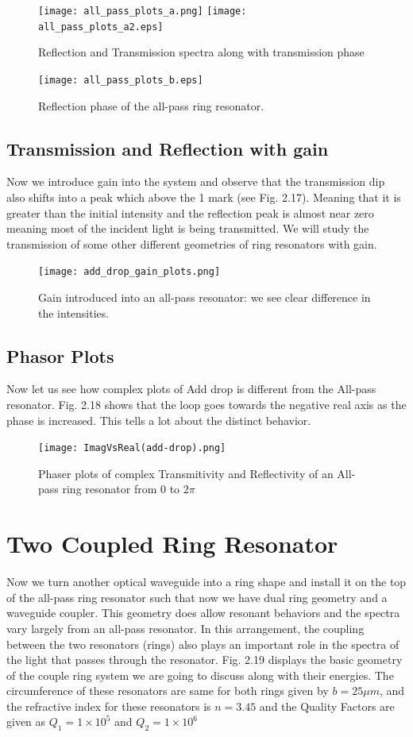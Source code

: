 \begin{figure}[h]
\centering
\texttt{[image: all\_pass\_plots\_a.png]}
\texttt{[image: all\_pass\_plots\_a2.eps]}
\caption{Reflection and Transmission spectra along with transmission phase} 
\end{figure}
\newpage
\begin{figure}[t]
\centering
\texttt{[image: all\_pass\_plots\_b.eps]}
\caption{Reflection phase of the all-pass ring resonator.}
\end{figure}

\subsection{Transmission and Reflection with gain}
Now we introduce gain into the system and observe that the transmission dip also shifts into a peak which above the 1 mark (see Fig. 2.17). Meaning that it is greater than the initial intensity and the reflection peak is almost near zero meaning most of the incident light is being transmitted. We will study the transmission of some other different geometries of ring resonators with gain. 


\begin{figure}[h]
\centering
\texttt{[image: add\_drop\_gain\_plots.png]}
\caption{Gain introduced into an all-pass resonator: we see clear difference in the intensities.}
\end{figure}

\subsection{Phasor Plots}
Now let us see how complex plots of Add drop is different from the All-pass resonator. Fig. 2.18 shows that the loop goes towards the negative real axis as the phase is increased. This tells a lot about the distinct behavior.

\begin{figure}[h]
\centering
\texttt{[image: ImagVsReal(add-drop).png]}
\caption{Phaser plots of complex Transmitivity and Reflectivity of an All-pass ring resonator from 0 to $2\pi$}
\end{figure}


\section{Two Coupled Ring Resonator}
Now we turn another optical waveguide into a ring shape and install it on the top of the all-pass ring resonator such that now we have dual ring geometry and a waveguide coupler. This geometry does allow resonant behaviors and the spectra vary largely from an all-pass resonator.
In this arrangement, the coupling between the two resonators (rings) also plays an important role in the spectra of the light that passes through the resonator. Fig. 2.19 displays the basic geometry of the couple ring system we are going to discuss along with their energies. The circumference of these resonators are same for both rings given by $b = 25\mu m$, and the refractive index for these resonators is $n=3.45$ and the Quality Factors are given as $Q_{1} = 1\times10^{5}$ and $Q_{2} = 1\times10^{6}$

